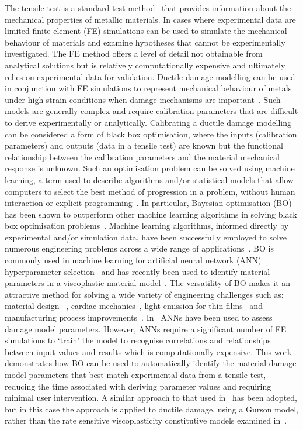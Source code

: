 \documentclass[preprint, review, 12pt]{elsarticle}
\begin{document}
	The tensile test is a standard test method~\cite{ENISO6892} that provides information about the mechanical properties of metallic materials.
	In cases where experimental data are limited finite element (FE) simulations can be used to simulate the mechanical behaviour of materials and examine hypotheses that cannot be experimentally investigated.
	The FE method offers a level of detail not obtainable from analytical solutions but is relatively computationally expensive and ultimately relies on experimental data for validation.
	Ductile damage modelling can be used in conjunction with FE simulations to represent mechanical behaviour of metals under high strain conditions when damage mechanisms are important~\cite{ABBASSI2013, CHAHBOUB2019, ZHANG2021}.
	Such models are generally complex and require calibration parameters that are difficult to derive experimentally or analytically.
	Calibrating a ductile damage modelling can be considered a form of black box optimisation, where the inputs (calibration parameters) and outputs (data in a tensile test) are known but the functional relationship between the calibration parameters and the material mechanical response is unknown.
	Such an optimisation problem can be solved using machine learning, a term used to describe algorithms and/or statistical models that allow computers to select the best method of progression in a problem, without human interaction or explicit programming~\cite{BIKMKHAMETOV2020}.
	In particular, Bayesian optimisation (BO) has been shown to outperform other machine learning algorithms in solving black box optimisation problems~\cite{SNOEK2012}.
	Machine learning algorithms, informed directly by experimental and/or simulation data, have been successfully employed to solve numerous engineering problems across a wide range of applications~\cite{MONGAN2022, LIU2020, HEGDE2020}.
	BO is commonly used in machine learning for artificial neural network (ANN) hyperparameter selection~\cite{DEWANCKER2016, MONGAN2022, BIKMKHAMETOV2020, GHAVAMIAN2021} and has recently been used to identify material parameters in a viscoplastic material model~\cite{RYAN2022}.
	The versatility of BO makes it an attractive method for solving a wide variety of engineering challenges such as: material design ~\cite{ZHANG2020, CHUAQUI2021}, cardiac mechanics~\cite{BOROWSKA2022}, light emission for thin films~\cite{WANKERL2022} and manufacturing process improvements~\cite{MONGAN2022, GUNN2022}.
	In~\cite{ABENDROTH2006, ABBASSI2013, CHAHBOUB2019, CHEN2021} ANNs have been used to assess damage model parameters.
	However, ANNs require a significant number of FE simulations to `train' the model to recognise correlations and relationships between input values and results which is computationally expensive.
	This work demonstrates how BO can be used to automatically identify the material damage model parameters that best match experimental data from a tensile test, reducing the time associated with deriving parameter values and requiring minimal user intervention.
	A similar approach to that used in~\citet{RYAN2022} has been adopted, but in this case the approach is applied to ductile damage, using a Gurson model, rather than the rate sensitive viscoplasticity constitutive models examined in~\citet{RYAN2022}.
\end{document}
